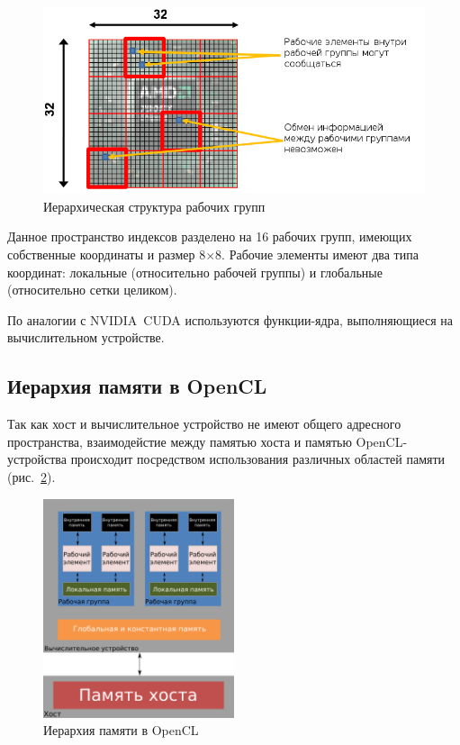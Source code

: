 \begin{figure}[p]
\centering
\includegraphics[width=1\textwidth]{include/graphics/image4}
\caption{Иерархическая структура рабочих групп}
\label{fig:WorkGroupsStructure}
\end{figure}

Данное пространство индексов разделено на 16 рабочих групп, имеющих
собственные координаты и размер 8$ \times $8. Рабочие элементы имеют два типа координат: локальные (относительно рабочей группы) и глобальные (относительно сетки целиком).

По аналогии с NVIDIA~CUDA используются функции-ядра, выполняющиеся на 
вычислительном устройстве.

\subsection{Иерархия памяти в OpenCL}

Так как хост и вычислительное устройство не имеют общего адресного
пространства, взаимодейстие между памятью хоста и памятью OpenCL-
устройства происходит посредством использования различных областей памяти (рис.~\ref{fig:OpenCLMemoryStructure}).

\begin{figure}[p]
\centering
\includegraphics[width=0.5\textwidth]{include/graphics/image5}
\caption{Иерархия памяти в OpenCL}
\label{fig:OpenCLMemoryStructure}
\end{figure}

